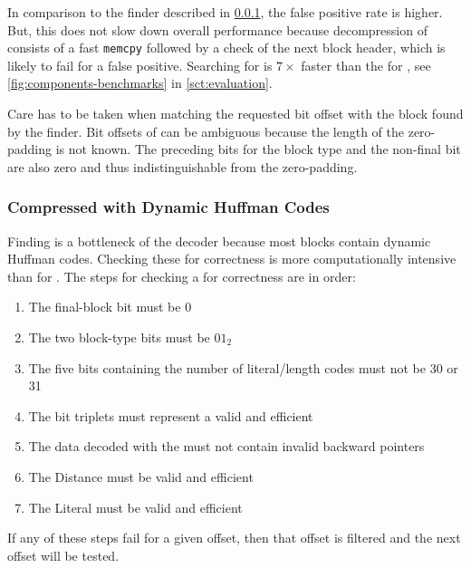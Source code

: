 In comparison to the \dynblock finder described in \cref{sct:dynblocks}, the false positive rate is higher.
But, this does not slow down overall performance because decompression of \rawblocks consists of a fast \texttt{memcpy} followed by a check of the next block header, which is likely to fail for a false positive.
Searching for \rawblocks is $7\times$ faster than the \blockfinder for \dynblocks, see \cref{fig:components-benchmarks} in \cref{sct:evaluation}.

Care has to be taken when matching the requested bit offset with the block found by the \rawblock finder.
Bit offsets of \rawblocks can be ambiguous because the length of the zero-padding is not known.
The preceding bits for the block type and the non-final bit are also zero and thus indistinguishable from the zero-padding.


\subsubsection{Compressed with Dynamic Huffman Codes}
\label{sct:dynblocks}

Finding \dynblocks is a bottleneck of the decoder because most  blocks contain dynamic Huffman codes.
Checking these for correctness is more computationally intensive than for \rawblocks.
The steps for checking a \dynblock for correctness are in order:

\begin{enumerate}
    \item The final-block bit must be 0
    \item The two block-type bits must be ${01}_2$
    \item The five bits containing the number of literal/length codes must not be 30 or 31
    \item The \precode bit triplets must represent a valid and efficient \huffcode
    \item The data decoded with the \precode must not contain invalid backward pointers
    \item The Distance \huffcode must be valid and efficient
    \item The Literal \huffcode must be valid and efficient
\end{enumerate}

If any of these steps fail for a given offset, then that offset is filtered and the next offset will be tested.

